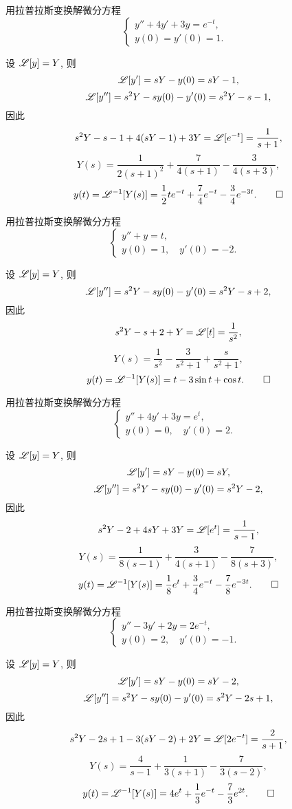 \begin{exercise}
  用拉普拉斯变换解微分方程
	\[\begin{cases}y''+4y'+3y=e^{-t},&\\y(0)=y'(0)=1.\end{cases}\]
\end{exercise}
\begin{solution}
	设 $\mathscr{L}[y]=Y$, 则
	\[\mathscr{L}[y']=sY-y(0)=sY-1,\]
	\[\mathscr{L}[y'']=s^2Y-sy(0)-y'(0)=s^2Y-s-1,\]
	因此
	\[s^2Y-s-1+4(sY-1)+3Y=\mathscr{L}[e^{-t}]=\frac{1}{s+1},\]
	\[Y(s)=\frac{1}{2(s+1)^2}+\frac{7}{4(s+1)}-\frac3{4(s+3)},\]
	\[y(t)=\mathscr{L}^{-1}[Y(s)]=\frac12 te^{-t}+\frac74 e^{-t}-\frac34 e^{-3t}. \qedhere\]
\end{solution}


\begin{exercise}
	用拉普拉斯变换解微分方程
	\[\begin{cases}y''+y=t,&\\y(0)=1,\quad y'(0)=-2.\end{cases}\]
\end{exercise}
\begin{solution}
	设 $\mathscr{L}[y]=Y$, 则
	\[\mathscr{L}[y'']=s^2Y-sy(0)-y'(0)=s^2Y-s+2,\]
	因此
	\[s^2Y-s+2+Y=\mathscr{L}[t]=\frac{1}{s^2},\]
	\[Y(s)=\frac1{s^2}-\frac3{s^2+1}+\frac s{s^2+1},\]
	\[y(t)=\mathscr{L}^{-1}[Y(s)]=t-3\sin t+\cos t. \qedhere\]
\end{solution}


\begin{exercise}
	用拉普拉斯变换解微分方程
	\[\begin{cases}y''+4y'+3y=e^t,&\\y(0)=0,\quad y'(0)=2.\end{cases}\]
\end{exercise}
\begin{solution}
	设 $\mathscr{L}[y]=Y$, 则
	\[\mathscr{L}[y']=sY-y(0)=sY,\]
	\[\mathscr{L}[y'']=s^2Y-sy(0)-y'(0)=s^2Y-2,\]
	因此
	\[s^2Y-2+4sY+3Y=\mathscr{L}[e^t]=\frac{1}{s-1},\]
	\[Y(s)=\frac{1}{8(s-1)}+\frac{3}{4(s+1)}-\frac7{8(s+3)},\]
	\[y(t)=\mathscr{L}^{-1}[Y(s)]=\frac18e^t+\frac34 e^{-t}-\frac78 e^{-3t}. \qedhere\]
\end{solution}


\begin{exercise}
	用拉普拉斯变换解微分方程
	\[\begin{cases}y''-3y'+2y=2e^{-t},&\\y(0)=2,\quad y'(0)=-1.\end{cases}\]
\end{exercise}
\begin{solution}
	设 $\mathscr{L}[y]=Y$, 则
	\[\mathscr{L}[y']=sY-y(0)=sY-2,\]
	\[\mathscr{L}[y'']=s^2Y-sy(0)-y'(0)=s^2Y-2s+1,\]
	因此
	\[s^2Y-2s+1-3(sY-2)+2Y=\mathscr{L}[2e^{-t}]=\frac{2}{s+1},\]
	\[Y(s)=\frac{4}{s-1}+\frac{1}{3(s+1)}-\frac7{3(s-2)},\]
	\[y(t)=\mathscr{L}^{-1}[Y(s)]=4e^t+\frac13 e^{-t}-\frac73e^{2t}. \qedhere\]
\end{solution}


